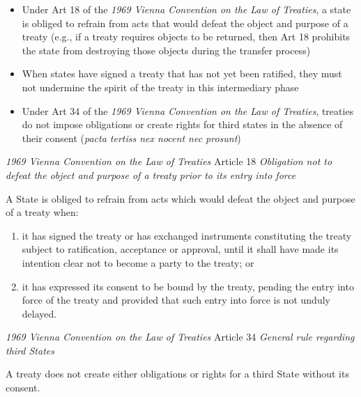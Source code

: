 \begin{itemize}
    \item Under Art 18 of the \textit{1969 Vienna Convention on the Law of Treaties}, a state is obliged to refrain from acts that would defeat the object and purpose of a treaty (e.g., if a treaty requires objects to be returned, then Art 18 prohibits the state from destroying those objects during the transfer process)
    \item When states have signed a treaty that has not yet been ratified, they must not undermine the spirit of the treaty in this intermediary phase
    \item Under Art 34 of the \textit{1969 Vienna Convention on the Law of Treaties}, treaties do not impose obligations or create rights for third states in the absence of their consent (\textit{pacta tertiss nex nocent nec prosunt})
\end{itemize}

\begin{conventiondetails}{\textit{1969 Vienna Convention on the Law of Treaties} Article 18}\label{VCLT Art 18}
    \flushleft
    \textit{Obligation not to defeat the object and purpose of a treaty prior to its entry into force}

    \vspace{\baselineskip}

    A State is obliged to refrain from acts which would defeat the object and purpose of a treaty when:

    \begin{enumerate}[label=(\alph*)]
        \item it has signed the treaty or has exchanged instruments constituting the treaty subject to ratification, acceptance or approval, until it shall have made its intention clear not to become a party to the treaty; or 
        \item it has expressed its consent to be bound by the treaty, pending the entry into force of the treaty and provided that such entry into force is not unduly delayed.
    \end{enumerate}
\end{conventiondetails}

\begin{conventiondetails}{\textit{1969 Vienna Convention on the Law of Treaties} Article 34}\label{VCLT Art 34}
    \flushleft
    \textit{General rule regarding third States}

    \vspace{\baselineskip}

    A treaty does not create either obligations or rights for a third State without its consent.
\end{conventiondetails}

